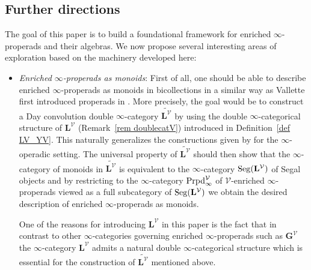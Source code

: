 \documentclass{amsart}
\numberwithin{theorem}{subsection}
\theoremstyle{definition}
\newcommand{\xV}{\mathcal{V}}
\newcommand{\name}[1]{\ensuremath{\text{\textup{#1}}}}
\newcommand{\levelg}{\mathbf{L}}
\newcommand{\levelV}{\levelg^\xV}
\newcommand{\bbY}{\mathbf{G}}
\newcommand{\bbYV}{\bbY^{\xV}}
\newcommand{\Seg}{\name{Seg}}
\begin{document}
\subsection{Further directions}
The goal of this paper is to build a foundational framework for enriched $\infty$-properads and their algebras. 
We now propose several interesting areas of exploration  based on the machinery developed here:
\begin{itemize}[leftmargin=*]
\item \emph{Enriched $\infty$-properads as monoids}: 
First of all, one should be able to describe enriched $\infty$-properads as monoids in bicollections in a similar way as Vallette first introduced properads in \cite{Vallette:KDP}.
More precisely, the goal would be to construct a Day convolution double $\infty$-category $\widetilde{\levelV}$ by using the double $\infty$-categorical structure of $\levelV$ (Remark~\ref{rem doublecatV}) introduced in Definition~\ref{def LV_YV}.
This naturally generalizes the constructions given by \cite{HaugsengSS} for the $\infty$-operadic setting. 
The universal property of $\widetilde{\levelV}$ should then show that the $\infty$-category of monoids in $\widetilde{\levelV}$ is equivalent to the $\infty$-category $\Seg(\levelV)$ of Segal objects and by restricting to the $\infty$-category $\name{Prpd}^\xV_\infty$ of $\xV$-enriched $\infty$-properads viewed as a full subcategory of $\Seg(\levelV)$ we obtain the desired description of enriched $\infty$-properads as monoids. 

One of the reasons for introducing $\levelV$ in this paper is the fact that in contrast to other $\infty$-categories governing enriched $\infty$-properads such as $\bbYV$ the $\infty$-category $\levelV$ admits a natural double $\infty$-categorical structure which is essential for the construction of $\widetilde{\levelV}$ mentioned above.


\end{itemize}
\end{document}
